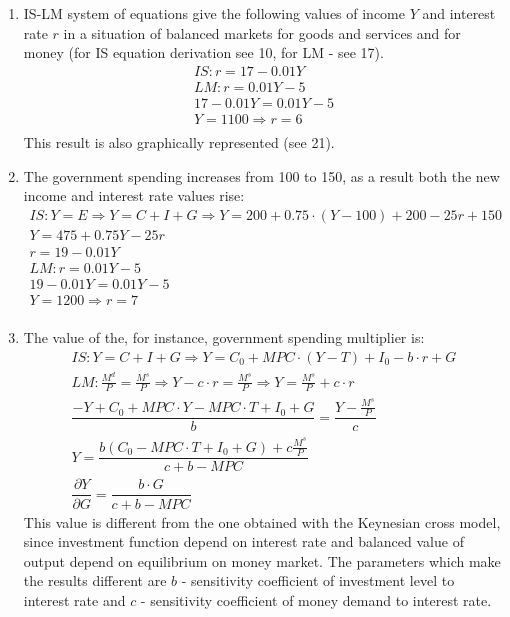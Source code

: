 \documentclass[a4paper,12pt]{article} %
\begin{document}
\begin{enumerate}
\begin{enumerate} [label=\arabic*)]



\item   IS-LM system of equations give the following values of income $ Y $ and interest rate $ r $  in a
situation of balanced markets for goods and services and for money (for IS equation derivation see 10, for LM - see 17). 
\begin{gather}
IS: r = 17 - 0.01Y \\
LM: r =  0.01Y - 5 \\
17 - 0.01Y = 0.01Y - 5 \\
Y = 1100 \Rightarrow r = 6 \\
\end{gather} 
This result is also graphically
represented (see 21).

\item  The government spending increases from 100 to 150, as a result both the new income
and interest rate values rise:
\begin{gather}
IS: Y=E \Rightarrow Y = C + I + G \Rightarrow Y = 200 + 0.75 \cdot (Y - 100) + 200 - 25r + 150 \\
Y =  475 + 0.75Y - 25r\\
r = 19 - 0.01Y \\
LM: r =  0.01Y - 5 \\
19 - 0.01Y = 0.01Y - 5 \\
Y = 1200 \Rightarrow r = 7 \\
\end{gather} 
\item  The value of the, for instance, government spending multiplier is: 
\begin{gather}
IS: Y = C + I + G \Rightarrow Y = C_{0} + MPC \cdot (Y - T) + I_{0} - b \cdot r + G \\
LM: \frac{M^{d}}{P} = \frac{M^{s}}{P} \Rightarrow Y - c \cdot r = \frac{M^{s}}{P}  \Rightarrow Y =  \frac{M^{s}}{P} + c \cdot r \\
\dfrac{-Y + C_{0} + MPC \cdot Y - MPC \cdot T + I_{0}  + G}{b} = \dfrac{Y - \frac{M^{s}}{P} }{c} \\
Y = \dfrac{b(C_{0}  - MPC \cdot T + I_{0}  + G) + c\frac{M^{s}}{P} }{ c  + b - MPC} \\
\dfrac{\partial Y}{\partial G} =  \dfrac{b \cdot G }{ c  + b - MPC} 
\end{gather} 
This value is different from the one obtained with the
Keynesian cross model, since investment function depend on interest rate and balanced value of output depend on equilibrium on money market. The parameters which make the results different are $ b $ - sensitivity coefficient of  investment level to interest rate and $ c $ -  sensitivity coefficient of  money demand to interest rate.


\end{enumerate}
\end{enumerate}
\end{document}
